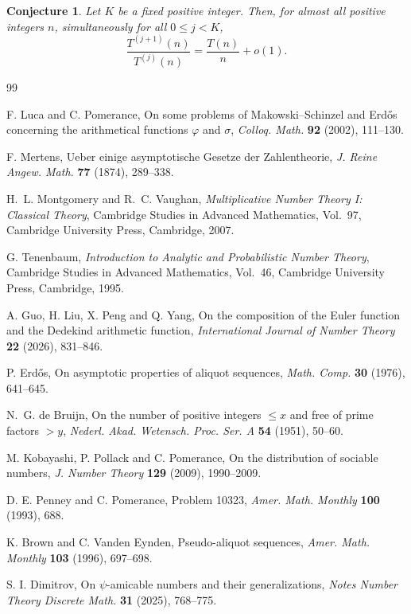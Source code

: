 \documentclass{article}
\newtheorem{conjecture}{Conjecture}
\begin{document}
\begin{conjecture}\label{conj:higher}
Let $K$ be a fixed positive integer. Then, for almost all positive
integers $n$, simultaneously for all $0\le j<K$,
\[
\frac{T^{(j+1)}(n)}{T^{(j)}(n)}
=
\frac{T(n)}{n}+o(1).
\]
\end{conjecture}


\begin{thebibliography}{99}

F. Luca and C. Pomerance,
On some problems of Makowski--Schinzel and Erd\H{o}s concerning
the arithmetical functions $\varphi$ and $\sigma$,
\textit{Colloq. Math.} \textbf{92} (2002), 111--130.

F. Mertens,
Ueber einige asymptotische Gesetze der Zahlentheorie,
\textit{J. Reine Angew. Math.} \textbf{77} (1874), 289--338.

H.~L. Montgomery and R.~C. Vaughan,
\textit{Multiplicative Number Theory I: Classical Theory},
Cambridge Studies in Advanced Mathematics, Vol.~97,
Cambridge University Press, Cambridge, 2007.

G. Tenenbaum,
\textit{Introduction to Analytic and Probabilistic Number Theory},
Cambridge Studies in Advanced Mathematics, Vol.~46,
Cambridge University Press, Cambridge, 1995.

A. Guo, H. Liu, X. Peng and Q. Yang,
On the composition of the Euler function and the Dedekind arithmetic
function,
\textit{International Journal of Number Theory}
\textbf{22} (2026), 831--846.

P. Erd\H{o}s,
On asymptotic properties of aliquot sequences,
\textit{Math. Comp.} \textbf{30} (1976), 641--645.

N.~G. de Bruijn,
On the number of positive integers $\le x$ and free of prime
factors $>y$,
\textit{Nederl. Akad. Wetensch. Proc. Ser. A}
\textbf{54} (1951), 50--60.

M. Kobayashi, P. Pollack and C. Pomerance,
On the distribution of sociable numbers,
\textit{J. Number Theory} \textbf{129} (2009), 1990--2009.

D. E. Penney and C. Pomerance,
Problem 10323,
\textit{Amer. Math. Monthly} \textbf{100} (1993), 688.

K. Brown and C. Vanden Eynden,
Pseudo-aliquot sequences,
\textit{Amer. Math. Monthly} \textbf{103} (1996), 697--698.

S. I. Dimitrov,
On $\psi$-amicable numbers and their generalizations,
\textit{Notes Number Theory Discrete Math.}
\textbf{31} (2025), 768--775.

\end{thebibliography}
\end{document}
